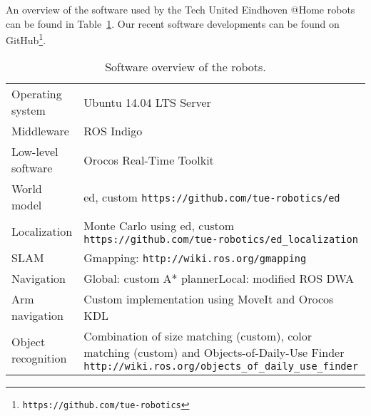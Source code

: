 An overview of the software used by the Tech United Eindhoven @Home robots can be found in Table~\ref{tab:softwarespec}. Our recent software developments can be found on GitHub\footnote{\texttt{https://github.com/tue-robotics}}.
\begin{table}[H]
    \begin{center}
    \caption{Software overview of the robots.}
    \label{tab:softwarespec}
    \vspace{-0.25cm}
    \renewcommand{\arraystretch}{1.0}
    \setlength{\tabcolsep}{5pt}
        \begin{tabular}{p{} p{}}
        	\toprule
            Operating system & Ubuntu 14.04 LTS Server\\
            
            Middleware & ROS Indigo\\
            
            Low-level software & Orocos Real-Time Toolkit\\
            
            World model & \acrfull{ed}, custom \newline \texttt{https://github.com/tue-robotics/ed}\\
            
            Localization & Monte Carlo using \gls{ed}, custom \newline \texttt{https://github.com/tue-robotics/ed\_localization}\\
            
            SLAM & Gmapping: \texttt{http://wiki.ros.org/gmapping}\\
            
            Navigation & Global: custom A* planner\newline Local: modified ROS DWA\\
            
            Arm navigation & Custom implementation using MoveIt and Orocos KDL\\
            
            Object recognition & Combination of size matching (custom), color matching (custom) and Objects-of-Daily-Use Finder \newline \texttt{http://wiki.ros.org/objects\_of\_daily\_use\_finder} \\
            

\end{tabular}
\end{center}
\end{table}
